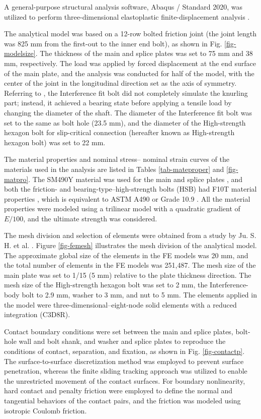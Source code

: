 A general-purpose structural analysis software, Abaqus / Standard 2020, was utilized to perform three-dimensional elastoplastic finite-displacement analysis \cite{Smith2020}. \par
The analytical model was based on a 12-row bolted friction joint (the joint length was 825 mm from the first-out to the inner end bolt), as shown in Fig. \ref{fig-modelsize}. The thickness of the main and splice plates was set to 75 mm and 38 mm, respectively. The load was applied by forced displacement at the end surface of the main plate, and the analysis was conducted for half of the model, with the center of the joint in the longitudinal direction set as the axis of symmetry. Referring to \cite{Shimozato2008ExperrimentalModel}, the Interference fit bolt did not completely simulate the knurling part; instead, it achieved a bearing state before applying a tensile load by changing the diameter of the shaft. The diameter of the Interference fit bolt was set to the same as bolt hole (23.5 mm), and the diameter of the High-strength hexagon bolt for slip-critical connection (hereafter known as High-strength hexagon bolt) was set to 22 mm. \par

The material properties and nominal stress-- nominal strain curves of the materials used in the analysis are listed in Tables \ref{tab-mateproper} and \ref{fig-matpro}. The SM490Y material was used for the main and splice plates  \cite{JISsteel}, and both the friction- and bearing-type--high-strength bolts  (HSB) had F10T material properties \cite{JISbolt}, which is equivalent to ASTM A490 or Grade 10.9 \cite{ASTM-bolt,ISO-bolt}. All the material properties were modeled using a trilinear model with a quadratic gradient of $E/100$, and the ultimate strength was considered. \par

The mesh division and selection of elements were obtained from a study by Ju. S. H. et al. \cite{ju2004-boltfea}. Figure  \ref{fig-femesh} illustrates the mesh division of the analytical model. The approximate global size of the elements in the FE models was 20 mm, and the total number of elements in the FE models was 251,487. The mesh size of the main plate was set to 1/15 (5 mm) relative to the plate thickness direction. The mesh size of the High-strength hexagon bolt was set to 2 mm, the Interference-body bolt to 2.9 mm, washer to 3 mm, and nut to 5 mm. The elements applied in the model were three-dimensional--eight-node solid elements with a reduced integration (C3D8R). \par
Contact boundary conditions were set between the main and splice plates, bolt-hole wall and bolt shank, and washer and splice plates to reproduce the conditions of contact, separation, and fixation, as shown in Fig. \ref{fig-contactp}. The surface-to-surface discretization method was employed to prevent surface penetration, whereas the finite sliding tracking approach was utilized to enable the unrestricted movement of the contact surfaces. For boundary nonlinearity, hard contact and penalty friction were employed to define the normal and tangential behaviors of the contact pairs, and the friction was modeled using isotropic Coulomb friction. 

